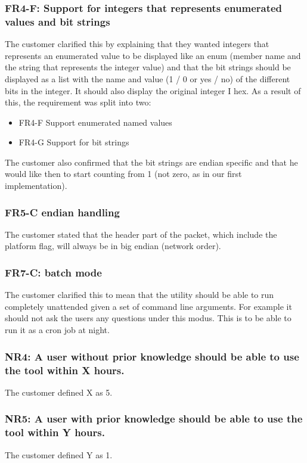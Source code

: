 \subsubsection{FR4-F: Support for \glspl{integer} that represents enumerated values and \glspl{bit string}}
The customer clarified this by explaining that they wanted \glspl{integer} that represents an enumerated value to be displayed like an \gls{enum} (\gls{member} name and the \gls{string} that represents the \gls{integer} value) and that the \glspl{bit string} should be displayed as a list with the name and value (1 / 0 or yes / no) of the different bits in the \gls{integer}. It should also display the original \gls{integer} I hex. As a result of this, the requirement was split into two:
\begin{itemize}
\item FR4-F	Support \glspl{enumerated named value}
\item FR4-G	Support for \glspl{bit string}
\end{itemize}
The customer also confirmed that the \glspl{bit string} are \gls{endian} specific and that he would like then to start counting from 1 (not zero, as in our first implementation).

\subsubsection{FR5-C \Gls{endian} handling}
The customer stated that the \gls{header} part of the \gls{packet}, which include the platform flag, will always be in big \gls{endian} (network order).

\subsubsection{FR7-C: \Gls{batch mode}}
The customer clarified this to mean that the \gls{utility} should be able to run completely unattended given a set of command line arguments. For example it should not ask the users any questions under this modus. This is to be able to run it as a cron job at night.

\subsubsection{NR4: A user without prior knowledge should be able to use the tool within X hours.}
The customer defined X as 5.

\subsubsection{NR5: A user with prior knowledge should be able to use the tool within Y hours.}
The customer defined Y as 1.

